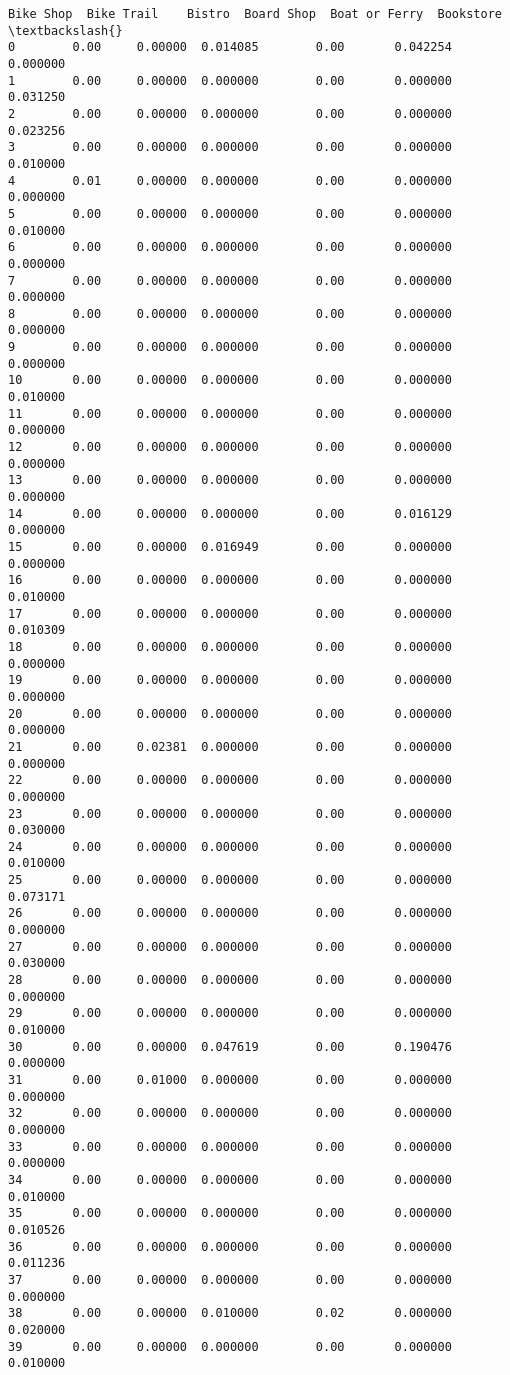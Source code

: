 \documentclass[11pt]{article}
\begin{document}
\begin{tcolorbox}[breakable, size=fbox, boxrule=.5pt, pad at break*=1mm, opacityfill=0]
\begin{Verbatim}[commandchars=\\\{\}]
    Bike Shop  Bike Trail    Bistro  Board Shop  Boat or Ferry  Bookstore  \textbackslash{}
0        0.00     0.00000  0.014085        0.00       0.042254   0.000000
1        0.00     0.00000  0.000000        0.00       0.000000   0.031250
2        0.00     0.00000  0.000000        0.00       0.000000   0.023256
3        0.00     0.00000  0.000000        0.00       0.000000   0.010000
4        0.01     0.00000  0.000000        0.00       0.000000   0.000000
5        0.00     0.00000  0.000000        0.00       0.000000   0.010000
6        0.00     0.00000  0.000000        0.00       0.000000   0.000000
7        0.00     0.00000  0.000000        0.00       0.000000   0.000000
8        0.00     0.00000  0.000000        0.00       0.000000   0.000000
9        0.00     0.00000  0.000000        0.00       0.000000   0.000000
10       0.00     0.00000  0.000000        0.00       0.000000   0.010000
11       0.00     0.00000  0.000000        0.00       0.000000   0.000000
12       0.00     0.00000  0.000000        0.00       0.000000   0.000000
13       0.00     0.00000  0.000000        0.00       0.000000   0.000000
14       0.00     0.00000  0.000000        0.00       0.016129   0.000000
15       0.00     0.00000  0.016949        0.00       0.000000   0.000000
16       0.00     0.00000  0.000000        0.00       0.000000   0.010000
17       0.00     0.00000  0.000000        0.00       0.000000   0.010309
18       0.00     0.00000  0.000000        0.00       0.000000   0.000000
19       0.00     0.00000  0.000000        0.00       0.000000   0.000000
20       0.00     0.00000  0.000000        0.00       0.000000   0.000000
21       0.00     0.02381  0.000000        0.00       0.000000   0.000000
22       0.00     0.00000  0.000000        0.00       0.000000   0.000000
23       0.00     0.00000  0.000000        0.00       0.000000   0.030000
24       0.00     0.00000  0.000000        0.00       0.000000   0.010000
25       0.00     0.00000  0.000000        0.00       0.000000   0.073171
26       0.00     0.00000  0.000000        0.00       0.000000   0.000000
27       0.00     0.00000  0.000000        0.00       0.000000   0.030000
28       0.00     0.00000  0.000000        0.00       0.000000   0.000000
29       0.00     0.00000  0.000000        0.00       0.000000   0.010000
30       0.00     0.00000  0.047619        0.00       0.190476   0.000000
31       0.00     0.01000  0.000000        0.00       0.000000   0.000000
32       0.00     0.00000  0.000000        0.00       0.000000   0.000000
33       0.00     0.00000  0.000000        0.00       0.000000   0.000000
34       0.00     0.00000  0.000000        0.00       0.000000   0.010000
35       0.00     0.00000  0.000000        0.00       0.000000   0.010526
36       0.00     0.00000  0.000000        0.00       0.000000   0.011236
37       0.00     0.00000  0.000000        0.00       0.000000   0.000000
38       0.00     0.00000  0.010000        0.02       0.000000   0.020000
39       0.00     0.00000  0.000000        0.00       0.000000   0.010000


\end{Verbatim}
\end{tcolorbox}
\end{document}

